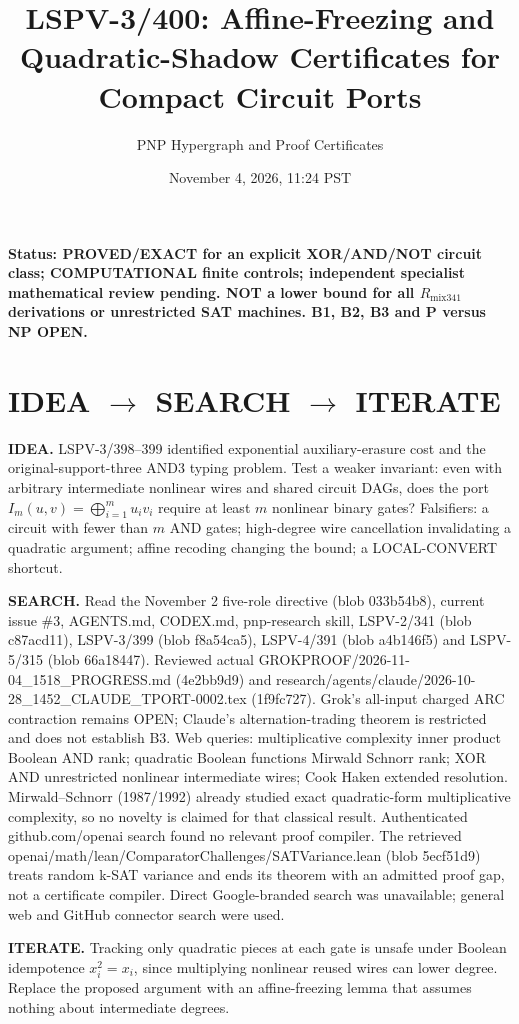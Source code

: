 \documentclass[11pt]{article}
\title{LSPV-3/400: Affine-Freezing and Quadratic-Shadow Certificates for Compact Circuit Ports}
\author{PNP Hypergraph and Proof Certificates}
\date{November 4, 2026, 11:24 PST}
\begin{document}
\maketitle
\noindent\textbf{Status: PROVED/EXACT for an explicit XOR/AND/NOT circuit class; COMPUTATIONAL finite controls; independent specialist mathematical review pending. NOT a lower bound for all $R_{\mathrm{mix341}}$ derivations or unrestricted SAT machines. B1, B2, B3 and P versus NP OPEN.}
\section*{IDEA $\to$ SEARCH $\to$ ITERATE}
\noindent\textbf{IDEA.} LSPV-3/398--399 identified exponential auxiliary-erasure cost and the original-support-three AND3 typing problem. Test a weaker invariant: even with arbitrary intermediate nonlinear wires and shared circuit DAGs, does the port $I_m(u,v)=\bigoplus_{i=1}^m u_iv_i$ require at least $m$ nonlinear binary gates? Falsifiers: a circuit with fewer than $m$ AND gates; high-degree wire cancellation invalidating a quadratic argument; affine recoding changing the bound; a LOCAL-CONVERT shortcut.
\par\noindent\textbf{SEARCH.} Read the November 2 five-role directive (blob 033b54b8), current issue \#3, AGENTS.md, CODEX.md, pnp-research skill, LSPV-2/341 (blob c87acd11), LSPV-3/399 (blob f8a54ca5), LSPV-4/391 (blob a4b146f5) and LSPV-5/315 (blob 66a18447). Reviewed actual GROKPROOF/2026-11-04\_1518\_PROGRESS.md (4e2bb9d9) and research/agents/claude/2026-10-28\_1452\_CLAUDE\_TPORT-0002.tex (1f9fc727). Grok's all-input charged ARC contraction remains OPEN; Claude's alternation-trading theorem is restricted and does not establish B3. Web queries: multiplicative complexity inner product Boolean AND rank; quadratic Boolean functions Mirwald Schnorr rank; XOR AND unrestricted nonlinear intermediate wires; Cook Haken extended resolution. Mirwald--Schnorr (1987/1992) already studied exact quadratic-form multiplicative complexity, so no novelty is claimed for that classical result. Authenticated github.com/openai search found no relevant proof compiler. The retrieved openai/math/lean/ComparatorChallenges/SATVariance.lean (blob 5ecf51d9) treats random k-SAT variance and ends its theorem with an admitted proof gap, not a certificate compiler. Direct Google-branded search was unavailable; general web and GitHub connector search were used.
\par\noindent\textbf{ITERATE.} Tracking only quadratic pieces at each gate is unsafe under Boolean idempotence $x_i^2=x_i$, since multiplying nonlinear reused wires can lower degree. Replace the proposed argument with an affine-freezing lemma that assumes nothing about intermediate degrees.
\end{document}
